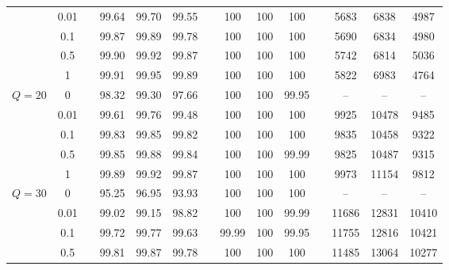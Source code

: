 \documentclass[UTF8]{article}
\begin{document}
\begin{定义}
\begin{table}[H]
\begin{tabular}[!h]{c c c c c c c c c c c c c c}
      &0.01  &  &99.64	&99.70	&99.55	&	&100	&100	&100	&	&5683	&6838	&4987\\

      &0.1  &  &99.87	&99.89	&99.78	&	&100	&100	&100	&	&5690	&6834	&4980\\

      &0.5  &  &99.90	&99.92	&99.87	&	&100	&100	&100	&	&5742	&6814	&5036\\

      &1  &  &99.91	&99.95	&99.89	&	&100	&100	&100	&	&5822	&6983	&4764\\
      \hline
      \multirow{5}{*}{$Q=20$}
      &0  &  &98.32	&99.30	&97.66	&	&100	&100	&99.95	&	&--	&--	&--\\

      &0.01  &  &99.61	&99.76	&99.48	&	&100	&100	&100	&	&9925	&10478	&9485\\

      &0.1  &  &99.83	&99.85	&99.82	&	&100	&100	&100	&	&9835	&10458	&9322\\

      &0.5  &  &99.85	&99.88	&99.84	&	&100	&100	&99.99	&	&9825	&10487	&9315\\

      &1  &  &99.89	&99.92	&99.87	&	&100	&100	&100	&	&9973	&11154	&9812\\
      \hline
      \multirow{5}{*}{$Q=30$}
      &0  &  &95.25	&96.95	&93.93	&	&100	&100	&100	&	&--	&--	&--\\

      &0.01  &  &99.02	&99.15	&98.82	&	&100	&100	&99.99	&	&11686	&12831	&10410\\

      &0.1  &  &99.72	&99.77	&99.63	&	&99.99	&100	&99.95	&	&11755	&12816	&10421\\

      &0.5  &  &99.81	&99.87	&99.78	&	&100	&100	&100	&	&11485	&13064	&10277\\


\end{tabular}
\end{table}
\end{定义}
\end{document}

